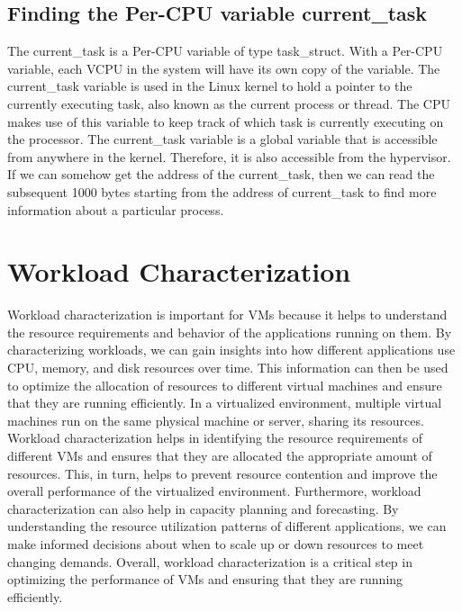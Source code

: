 \documentclass{report}
\begin{document}
\begin{spacing}{1.5}
\subsection{Finding the Per-CPU variable current\_task}
{\large
The current\_task is a Per-CPU variable of type task\_struct. With a Per-CPU variable, each VCPU in the system will have its own copy of the variable. The current\_task variable is used in the Linux kernel to hold a pointer to the currently executing task, also known as the current process or thread. The CPU makes use of this variable to keep track of which task is currently executing on the processor. The current\_task variable is a global variable that is accessible from anywhere in the kernel. Therefore, it is also accessible from the hypervisor. If we can somehow get the address of the current\_task, then we can read the subsequent 1000 bytes starting from the address of current\_task to find more information about a particular process.
\newline
}

\section{Workload Characterization}


{\large
Workload characterization is important for VMs because it helps to understand the resource requirements and behavior of the applications running on them. By characterizing workloads, we can gain insights into how different applications use CPU, memory, and disk resources over time. This information can then be used to optimize the allocation of resources to different virtual machines and ensure that they are running efficiently. In a virtualized environment, multiple virtual machines run on the same physical machine or server, sharing its resources. Workload characterization helps in identifying the resource requirements of different VMs and ensures that they are allocated the appropriate amount of resources. This, in turn, helps to prevent resource contention and improve the overall performance of the virtualized environment. Furthermore, workload characterization can also help in capacity planning and forecasting. By understanding the resource utilization patterns of different applications, we can make informed decisions about when to scale up or down resources to meet changing demands. Overall, workload characterization is a critical step in optimizing the performance of VMs and ensuring that they are running efficiently.
\newline
}



\end{spacing}
\end{document}
